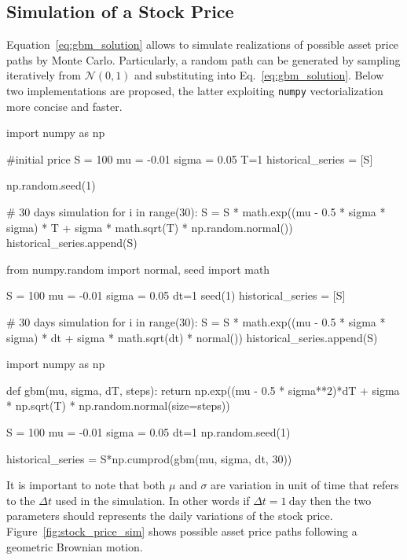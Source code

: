\subsection{Simulation of a Stock Price}

Equation~\ref{eq:gbm_solution} allows to simulate realizations of possible asset price paths by Monte Carlo. Particularly, a random path can be generated by sampling iteratively from $\mathcal{N}(0,1)$ and substituting into Eq.~\ref{eq:gbm_solution}.
Below two implementations are proposed, the latter exploiting \texttt{numpy} vectorialization more concise and faster.

\begin{ipython}
import numpy as np

#initial price
S = 100
mu = -0.01
sigma = 0.05
T=1
historical_series = [S]

np.random.seed(1)

# 30 days simulation
for i in range(30):
    S = S * math.exp((mu - 0.5 * sigma * sigma) * T +
                      sigma * math.sqrt(T) * np.random.normal())
    historical_series.append(S)
\end{ipython}

\begin{ipython}
from numpy.random import normal, seed
import math

S = 100
mu = -0.01
sigma = 0.05
dt=1
seed(1)
historical_series = [S]

# 30 days simulation
for i in range(30):
    S = S * math.exp((mu - 0.5 * sigma * sigma) * dt +
                      sigma * math.sqrt(dt) * normal())
    historical_series.append(S)
\end{ipython}

\begin{ipython}
import numpy as np

def gbm(mu, sigma, dT, steps):
  return np.exp((mu - 0.5 * sigma**2)*dT + sigma * np.sqrt(T) * np.random.normal(size=steps))

S = 100
mu = -0.01
sigma = 0.05
dt=1
np.random.seed(1)

historical_series = S*np.cumprod(gbm(mu, sigma, dt, 30))
\end{ipython}

It is important to note that both $\mu$ and $\sigma$ are variation in unit of time that refers to the $\Delta t$ used in the simulation. In other words if $\Delta t = 1~\textrm{day}$ then the two parameters should represents the daily variations of the stock price. Figure~\ref{fig:stock_price_sim} shows possible asset price paths following a geometric Brownian motion. 

